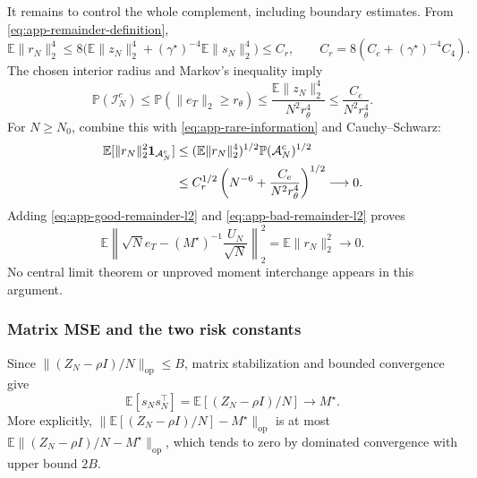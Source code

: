 \documentclass[10pt,twoside,letterpaper]{article}
\newcommand{\E}{\mathbb E}
\newcommand{\Prob}{\mathbb P}
\newcommand{\op}{\mathrm{op}}
\newcommand{\norm}[1]{\lVert #1\rVert}
\begin{document}
It remains to control the whole complement, including boundary
estimates. From \eqref{eq:app-remainder-definition},
\begin{equation}
\E\norm{r_N}_2^4
\le8\big(\E\norm{z_N}_2^4+
 (\gamma^\star)^{-4}\E\norm{s_N}_2^4\big)
\le C_r,\qquad C_r=8(C_e+(\gamma^\star)^{-4}C_4).
\label{eq:app-remainder-fourth}
\end{equation}
The chosen interior radius and Markov's inequality imply
\begin{equation}
\Prob(\mathcal I_N^c)
\le\Prob(\norm{e_T}_2\ge r_\theta)
\le\frac{\E\norm{z_N}_2^4}{N^2r_\theta^4}
\le\frac{C_e}{N^2r_\theta^4}.
\label{eq:app-boundary-probability}
\end{equation}
For $N\ge N_0$, combine this with
\eqref{eq:app-rare-information} and Cauchy--Schwarz:
\begin{align}
\E[\norm{r_N}_2^2\mathbf1_{\mathcal A_N^c}]
&\le(\E\norm{r_N}_2^4)^{1/2}
\Prob(\mathcal A_N^c)^{1/2}\notag\\
&\le C_r^{1/2}\left(N^{-6}+
\frac{C_e}{N^2r_\theta^4}\right)^{1/2}\longrightarrow0.
\label{eq:app-bad-remainder-l2}
\end{align}
Adding \eqref{eq:app-good-remainder-l2} and
\eqref{eq:app-bad-remainder-l2} proves
\begin{equation}
\E\left\|\sqrt N e_T-(M^\star)^{-1}\frac{U_N}{\sqrt N}\right\|_2^2
=\E\norm{r_N}_2^2\longrightarrow0.
\label{eq:app-l2-linearization}
\end{equation}
No central limit theorem or unproved moment interchange appears in
this argument.

\subsubsection{Matrix MSE and the two risk constants}

Since $\norm{(Z_N-\rho I)/N}_{\op}\le B$, matrix stabilization and
bounded convergence give
\begin{equation}
\E[s_Ns_N^\top]
=\E[(Z_N-\rho I)/N]\longrightarrow M^\star.
\label{eq:app-score-second-limit}
\end{equation}
More explicitly,
$\|\E[(Z_N-\rho I)/N]-M^\star\|_{\op}$ is at most
$\E\|(Z_N-\rho I)/N-M^\star\|_{\op}$, which tends to zero by
dominated convergence with upper bound $2B$.
\end{document}
